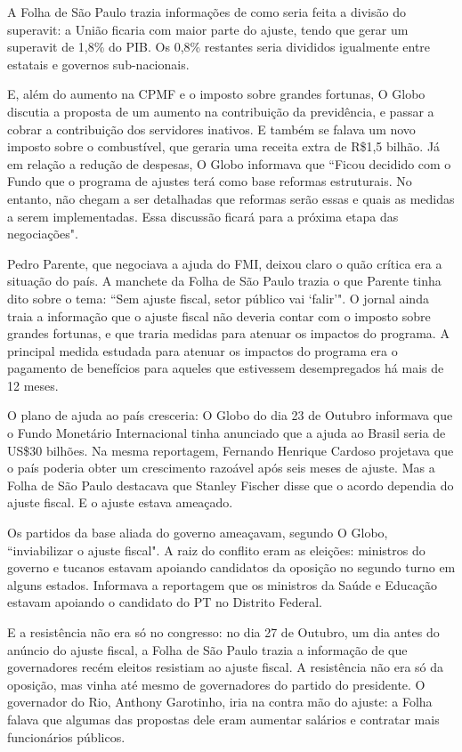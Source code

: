 \documentclass{article}
\begin{document}
A Folha de São Paulo trazia informações de como seria feita a divisão do superavit: a União ficaria com maior parte do ajuste, tendo que gerar um superavit de 1,8\% do PIB. Os 0,8\% restantes seria divididos igualmente entre estatais e governos sub-nacionais. 

E, além do aumento na CPMF e o imposto sobre grandes fortunas, O Globo discutia a proposta de um aumento na contribuição da previdência, e passar a cobrar a contribuição dos servidores inativos. E também se falava um novo imposto sobre o combustível, que geraria uma receita extra de R\$1,5 bilhão. Já em relação a redução de despesas, O Globo informava que ``Ficou decidido com o Fundo que o programa de ajustes terá como base reformas estruturais. No entanto, não chegam a ser detalhadas que reformas serão essas e quais as medidas a serem implementadas. Essa discussão ficará para a próxima etapa das negociações". 

Pedro Parente, que negociava a ajuda do FMI, deixou claro o quão crítica era a situação do país. A manchete da Folha de São Paulo trazia o que Parente tinha dito sobre o tema: ``Sem ajuste fiscal, setor público vai `falir'". O jornal ainda traia a informação que o ajuste fiscal não deveria contar com o imposto sobre grandes fortunas, e que traria medidas para atenuar os impactos do programa. A principal medida estudada para atenuar os impactos do programa era o pagamento de benefícios para aqueles que estivessem desempregados há mais de 12 meses.     

O plano de ajuda ao país cresceria: O Globo do dia 23 de Outubro informava que o Fundo Monetário Internacional tinha anunciado que a ajuda ao Brasil seria de US\$30 bilhões. Na mesma reportagem, Fernando Henrique Cardoso projetava que o país poderia obter um crescimento razoável após seis meses de ajuste. Mas a Folha de São Paulo destacava que Stanley Fischer disse que o acordo dependia do ajuste fiscal. E o ajuste estava ameaçado.

Os partidos da base aliada do governo ameaçavam, segundo O Globo, ``inviabilizar o ajuste fiscal". A raiz do conflito eram as eleições: ministros do governo e tucanos estavam apoiando candidatos da oposição no segundo turno em alguns estados. Informava a reportagem que os ministros da Saúde e Educação estavam apoiando o candidato do PT no Distrito Federal.

E a resistência não era só no congresso: no dia 27 de Outubro, um dia antes do anúncio do ajuste fiscal, a Folha de São Paulo trazia a informação de que governadores recém eleitos resistiam ao ajuste fiscal. A resistência não era só da oposição, mas vinha até mesmo de governadores do partido do presidente. O governador do Rio, Anthony Garotinho, iria na contra mão do ajuste: a Folha falava que algumas das propostas dele eram aumentar salários e contratar mais funcionários públicos. 
\end{document}
